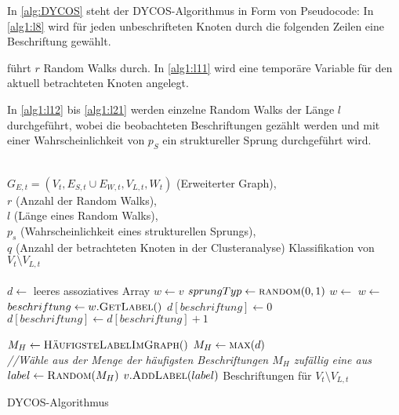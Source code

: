 In \cref{alg:DYCOS} steht der DYCOS-Algorithmus in Form von Pseudocode:
In \cref{alg1:l8} wird für jeden unbeschrifteten Knoten
durch die folgenden Zeilen eine Beschriftung gewählt.

 führt $r$ Random Walks durch. In \cref{alg1:l11} wird eine
temporäre Variable für den aktuell betrachteten Knoten angelegt.

In \cref{alg1:l12} bis \cref{alg1:l21} werden einzelne Random Walks der Länge
$l$ durchgeführt, wobei die beobachteten Beschriftungen gezählt werden und mit
einer Wahrscheinlichkeit von $p_S$ ein struktureller Sprung durchgeführt wird.

\begin{algorithm}[ht]
    \begin{algorithmic}[1]
        \Require \\$G_{E,t} = (V_t, E_{S,t} \cup E_{W,t}, V_{L,t}, W_t)$ (Erweiterter Graph),\\
                 $r$ (Anzahl der Random Walks),\\
                 $l$ (Länge eines Random Walks),\\
                 $p_s$ (Wahrscheinlichkeit eines strukturellen Sprungs),\\
                 $q$ (Anzahl der betrachteten Knoten in der Clusteranalyse)
        \Ensure  Klassifikation von $V_t \setminus V_{L,t}$\\
        \\

        \label{alg1:l8}
            \State $d \gets $ leeres assoziatives Array
            \label{alg1:l10}
                \State $w \gets v$\label{alg1:l11}
                \label{alg1:l12}
                    \State $sprungTyp \gets \Call{random}{0, 1}$
                        \State $w \gets$ 
                    \Else
                        \State $w \gets$ 
                    \EndIf
                    \State $beschriftung \gets w.\Call{GetLabel}{ }$
                        \State $d[beschriftung] \gets 0$
                    \EndIf
                    \State $d[beschriftung] \gets d[beschriftung] + 1$
                \EndFor\label{alg1:l21}
            \EndFor

             
                \State $M_H \gets \Call{HäufigsteLabelImGraph}{ }$
            \Else
                \State $M_H \gets \Call{max}{d}$
            \EndIf
            \\
            \State \textit{//Wähle aus der Menge der häufigsten Beschriftungen $M_H$ zufällig eine aus}
            \State $label \gets \Call{Random}{M_H}$
            \State $v.\Call{AddLabel}{label}$ 
        \EndFor
        \State \Return Beschriftungen für $V_t \setminus V_{L,t}$
    \end{algorithmic}
\caption{DYCOS-Algorithmus}
\label{alg:DYCOS}
\end{algorithm}

